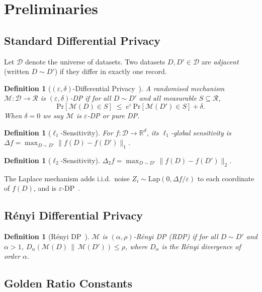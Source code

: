 \documentclass[12pt]{article}
\newtheorem{definition}[theorem]{Definition}
\newcommand{\Lap}{\mathrm{Lap}}
\newcommand{\eps}{\varepsilon}
\newcommand{\Mech}{\mathcal{M}}
\newcommand{\DB}{\mathcal{D}}
\newcommand{\Range}{\mathcal{R}}
\newcommand{\Pr}{\mathrm{Pr}}
\newcommand{\R}{\mathbb{R}}
\newcommand{\Sens}{\Delta}
\begin{document}
\section{Preliminaries}
\label{sec:prelim}

\subsection{Standard Differential Privacy}

Let $\DB$ denote the universe of datasets.  Two datasets $D, D' \in \DB$ are
\emph{adjacent} (written $D \sim D'$) if they differ in exactly one record.

\begin{definition}[$(\eps,\delta)$-Differential Privacy~\cite{Dwork2006}]
A randomised mechanism $\Mech : \DB \to \Range$ is $(\eps,\delta)$-DP if for
all $D \sim D'$ and all measurable $S \subseteq \Range$,
\[
  \Pr[\Mech(D) \in S] \;\le\; e^{\eps}\,\Pr[\Mech(D') \in S] + \delta.
\]
When $\delta = 0$ we say $\Mech$ is $\eps$-DP or \emph{pure} DP.
\end{definition}

\begin{definition}[$\ell_1$-Sensitivity]
For $f : \DB \to \R^d$, its \emph{$\ell_1$-global sensitivity} is
$\Sens f = \max_{D \sim D'} \|f(D) - f(D')\|_1$.
\end{definition}

\begin{definition}[$\ell_2$-Sensitivity]
$\Sens_2 f = \max_{D \sim D'} \|f(D) - f(D')\|_2$.
\end{definition}

The Laplace mechanism adds i.i.d.\ noise $Z_i \sim \Lap(0, \Sens f / \eps)$ to
each coordinate of $f(D)$, and is $\eps$-DP~\cite{Dwork2006}.

\subsection{Rényi Differential Privacy}

\begin{definition}[Rényi DP~\cite{Mironov2017}]
$\Mech$ is $(\alpha, \rho)$-Rényi DP (RDP) if for all $D \sim D'$ and
$\alpha > 1$,
$D_\alpha(\Mech(D)\,\|\,\Mech(D')) \le \rho$,
where $D_\alpha$ is the Rényi divergence of order $\alpha$.
\end{definition}

\subsection{Golden Ratio Constants}
\end{document}
